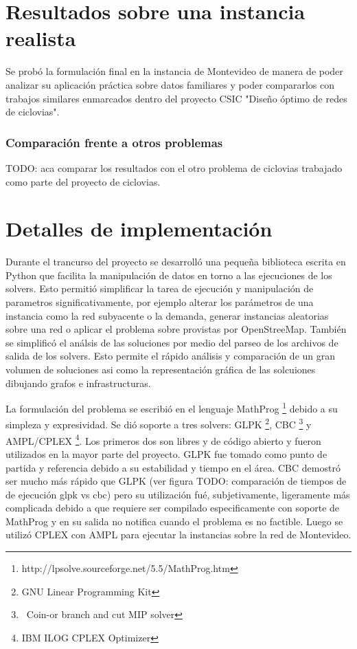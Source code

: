 \documentclass{article}
\begin{document}

  \section*{Resultados sobre una instancia realista}

  Se probó la formulación final en la instancia de Montevideo de manera de poder analizar su aplicación práctica sobre datos familiares y poder compararlos con trabajos similares enmarcados dentro del proyecto CSIC "Diseño óptimo de redes de ciclovias".


  \subsubsection*{Comparación frente a otros problemas}

  TODO: aca comparar los resultados con el otro problema de ciclovias trabajado como parte del proyecto de ciclovias.

  \section*{Detalles de implementación}

  Durante el trancurso del proyecto se desarrolló una pequeña biblioteca escrita en Python que facilita la manipulación de datos en torno a las ejecuciones de los solvers. Esto permitió simplificar la tarea de ejecución y manipulación de parametros significativamente, por ejemplo alterar los parámetros de una instancia como la red subyacente o la demanda, generar instancias aleatorias sobre una red o aplicar el problema sobre provistas por OpenStreeMap. También se simplificó el análsis de las soluciones por medio del parseo de los archivos de salida de los solvers. Esto permite el rápido análisis y comparación de un gran volumen de soluciones asi como la representación gráfica de las solcuiones dibujando grafos e infrastructuras.

  La formulación del problema se escribió en el lenguaje MathProg \footnote{http://lpsolve.sourceforge.net/5.5/MathProg.htm} debido a su simpleza y expresividad. Se dió soporte a tres solvers: GLPK \footnote{GNU Linear Programming Kit}, CBC \footnote{\ Coin-or branch and cut MIP solver} y AMPL/CPLEX \footnote{IBM ILOG CPLEX Optimizer}. Los primeros dos son libres y de código abierto y fueron utilizados en la mayor parte del proyecto. GLPK fue tomado como punto de partida y referencia debido a su estabilidad y tiempo en el área. CBC demostró ser mucho más rápido que GLPK (ver figura TODO: comparación de tiempos de de ejecución glpk vs cbc) pero su utilización fué, subjetivamente, ligeramente más complicada debido a que requiere ser compilado especificamente con soporte de MathProg y en su salida no notifica cuando el problema es no factible. Luego se utilizó CPLEX con AMPL para ejecutar la instancias sobre la red de Montevideo.
\end{document}
